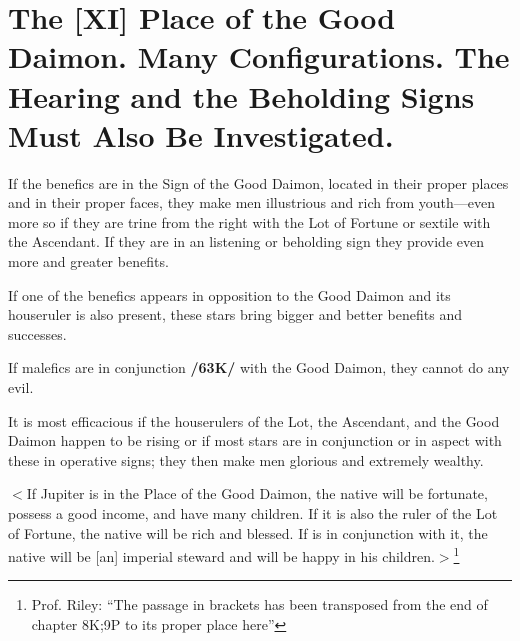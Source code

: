 \section{The [XI] Place of the Good Daimon. Many Configurations. The Hearing and the Beholding Signs Must Also Be Investigated.}

If the benefics are in the Sign of the Good Daimon, located in their proper places and in their proper faces, they make men illustrious and rich from youth—even more so if they are trine from the right with the Lot of Fortune or sextile with the Ascendant. If they are in an listening or beholding sign they provide even more and greater benefits. 

If one of the benefics appears in opposition to the Good Daimon and its houseruler is also present, these stars bring bigger and better benefits and successes. 

If malefics are in conjunction \textbf{/63K/} with the Good Daimon, they cannot do any evil. 

It is most efficacious if the houserulers of the Lot, the Ascendant, and the Good Daimon happen to be rising or if most stars are in conjunction or in aspect with these in operative signs; they then make men glorious and extremely wealthy. 

$<$If Jupiter is in the Place of the Good Daimon, the native will be fortunate, possess a good income, and have many
children. If it is also the ruler of the Lot of Fortune, the native will be rich and blessed. If \Mercury\xspace is in conjunction with it, the native will be [an] imperial steward and will be happy in his children.$>$\footnote{Prof. Riley: ``The passage in brackets has been transposed from the end of chapter 8K;9P to its proper place here''}

\newpage